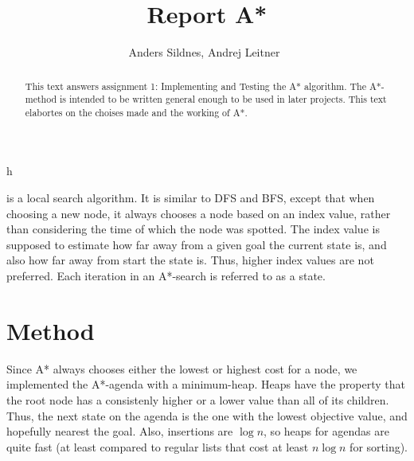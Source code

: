 \documentclass[journal]{IEEEtran}
\begin{document}
%
\title{Report A*}

\author{Anders Sildnes, Andrej Leitner~%
}%

%
{h}

\maketitle

\begin{abstract}
    This text answers assignment 1: Implementing and Testing the A* algorithm.
    The A*-method is intended to be written general enough to be used in later
    projects. This text elabortes on the choises made and the working of A*.
\end{abstract}

 is a local search algorithm. It is similar to DFS and BFS,
except that when choosing a new node, it always chooses a node based on an 
index value, rather than considering the time of which the node was spotted.
The index value is supposed to estimate how far away from a given goal
the current state is, and also how far away from start the state is.
Thus, higher index values are not preferred. Each iteration in an A*-search is referred to as a state. 

\section{Method}
Since A* always chooses either the lowest or highest cost for a node, we
implemented the A*-agenda with a minimum-heap. Heaps have the property that the root
node has a consistenly higher or a lower value than all of its children.
Thus, the next state on the agenda is the one with the lowest objective value,
and hopefully nearest the goal. Also,
insertions are $\log{n}$, so heaps for agendas are quite fast (at least compared
to regular lists that cost at least $n \log{n}$ for sorting).
\end{document}
